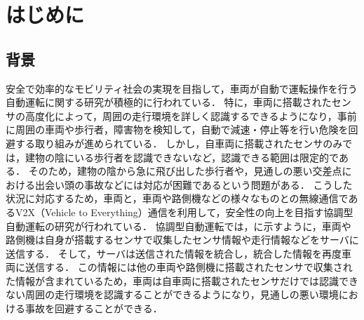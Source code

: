 \documentclass[a4paper,11pt,uplatex]{ujreport}
\begin{document}
\chapter{はじめに}
\label{chap:Introduction}


\section{背景}
\label{sec:背景}

    安全で効率的なモビリティ社会の実現を目指して，車両が自動で運転操作を行う自動運転に関する研究が積極的に行われている\cite{AD}．
    特に，車両に搭載されたセンサの高度化によって，周囲の走行環境を詳しく認識するできるようになり，事前に周囲の車両や歩行者，障害物を検知して，自動で減速・停止等を行い危険を回避する取り組みが進められている．
    しかし，自車両に搭載されたセンサのみでは，建物の陰にいる歩行者を認識できないなど，認識できる範囲は限定的である．
    そのため，建物の陰から急に飛び出した歩行者や，見通しの悪い交差点における出会い頭の事故などには対応が困難であるという問題がある．
    こうした状況に対応するため，車両と，車両や路側機などの様々なものとの無線通信であるV2X（Vehicle to Everything）通信を利用して，安全性の向上を目指す協調型自動運転の研究が行われている\cite{CAD, ITS}．
    協調型自動運転では，に示すように，車両や路側機は自身が搭載するセンサで収集したセンサ情報や走行情報などをサーバに送信する．
    そして，サーバは送信された情報を統合し，統合した情報を再度車両に送信する．
    この情報には他の車両や路側機に搭載されたセンサで収集された情報が含まれているため，車両は自車両に搭載されたセンサだけでは認識できない周囲の走行環境を認識することができるようになり，見通しの悪い環境における事故を回避することができる．\par
\end{document}
